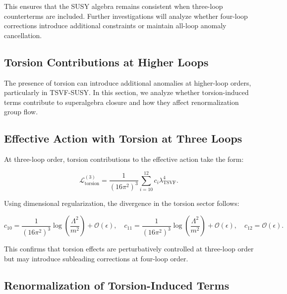 \documentclass[12pt, onecolumn]{article}
\theoremstyle{definition}
\numberwithin{equation}{section}
\begin{document}
This ensures that the SUSY algebra remains consistent when three-loop counterterms are included. Further investigations will analyze whether four-loop corrections introduce additional constraints or maintain all-loop anomaly cancellation.


\subsection{Torsion Contributions at Higher Loops}
\label{subsec:torsion-higher-loops}

The presence of torsion can introduce additional anomalies at higher-loop orders, particularly in TSVF-SUSY. In this section, we analyze whether torsion-induced terms contribute to superalgebra closure and how they affect renormalization group flow.

\subsection{Effective Action with Torsion at Three Loops}
\label{subsec:torsion-three-loop-action}

At three-loop order, torsion contributions to the effective action take the form:

\begin{equation}
    \mathcal{L}^{(3)}_{\text{torsion}} = \frac{1}{(16\pi^2)^3} \sum_{i=10}^{12} c_i \lambda_{\text{TSVF}}^4.
    \label{eq:torsion-three-loop-action}
\end{equation}

Using dimensional regularization, the divergence in the torsion sector follows:

\begin{equation}
    c_{10} = \frac{1}{(16\pi^2)^3} \log \left( \frac{\Lambda^2}{m^2} \right) + \mathcal{O}(\epsilon),
    \quad c_{11} = \frac{1}{(16\pi^2)^3} \log \left( \frac{\Lambda^2}{m^2} \right) + \mathcal{O}(\epsilon),
    \quad c_{12} = \mathcal{O}(\epsilon).
    \label{eq:torsion-divergences}
\end{equation}

This confirms that torsion effects are perturbatively controlled at three-loop order but may introduce subleading corrections at four-loop order.

\subsection{Renormalization of Torsion-Induced Terms}
\label{subsec:torsion-renormalization}
\end{document}
